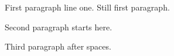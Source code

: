\documentclass{article}
\begin{document}
First paragraph line one.
Still first paragraph.

Second paragraph starts here.

Third paragraph after spaces.
\end{document}
